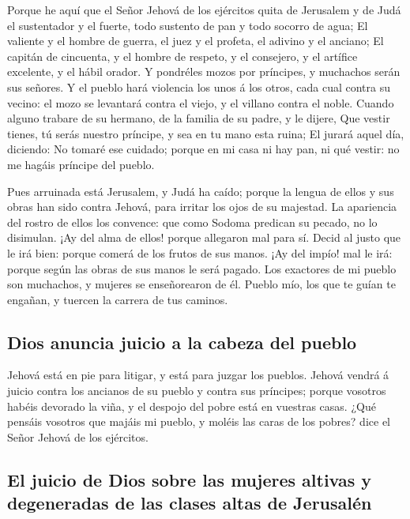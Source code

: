  Porque he aquí que el Señor Jehová de los ejércitos quita
de Jerusalem y de Judá el sustentador y el fuerte, todo sustento de pan
y todo socorro de agua;  El valiente y el hombre de guerra,
el juez y el profeta, el adivino y el anciano;  El capitán
de cincuenta, y el hombre de respeto, y el consejero, y el artífice
excelente, y el hábil orador.  Y pondréles mozos por
príncipes, y muchachos serán sus señores.  Y el pueblo hará
violencia los unos á los otros, cada cual contra su vecino: el mozo se
levantará contra el viejo, y el villano contra el noble. 
Cuando alguno trabare de su hermano, de la familia de su padre, y le
dijere, Que vestir tienes, tú serás nuestro príncipe, y sea en tu mano
esta ruina;  El jurará aquel día, diciendo: No tomaré ese
cuidado; porque en mi casa ni hay pan, ni qué vestir: no me hagáis
príncipe del pueblo.

 Pues arruinada está Jerusalem, y Judá ha caído; porque la
lengua de ellos y sus obras han sido contra Jehová, para irritar los
ojos de su majestad.  La apariencia del rostro de ellos los
convence: que como Sodoma predican su pecado, no lo disimulan. ¡Ay del
alma de ellos! porque allegaron mal para sí.  Decid al
justo que le irá bien: porque comerá de los frutos de sus manos.
 ¡Ay del impío! mal le irá: porque según las obras de sus
manos le será pagado.  Los exactores de mi pueblo son
muchachos, y mujeres se enseñorearon de él. Pueblo mío, los que te guían
te engañan, y tuercen la carrera de tus caminos.

\hypertarget{dios-anuncia-juicio-a-la-cabeza-del-pueblo}{%
\subsection{Dios anuncia juicio a la cabeza del
pueblo}\label{dios-anuncia-juicio-a-la-cabeza-del-pueblo}}

 Jehová está en pie para litigar, y está para juzgar los
pueblos.  Jehová vendrá á juicio contra los ancianos de su
pueblo y contra sus príncipes; porque vosotros habéis devorado la viña,
y el despojo del pobre está en vuestras casas.  ¿Qué
pensáis vosotros que majáis mi pueblo, y moléis las caras de los pobres?
dice el Señor Jehová de los ejércitos.

\hypertarget{el-juicio-de-dios-sobre-las-mujeres-altivas-y-degeneradas-de-las-clases-altas-de-jerusaluxe9n}{%
\subsection{El juicio de Dios sobre las mujeres altivas y degeneradas de
las clases altas de
Jerusalén}\label{el-juicio-de-dios-sobre-las-mujeres-altivas-y-degeneradas-de-las-clases-altas-de-jerusaluxe9n}}

